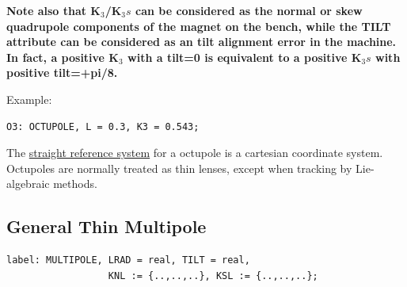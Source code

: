 \textbf{  Note also that K$_3$/K$_3s$ can be considered as the normal or
  skew quadrupole components of the magnet on the bench, while the TILT
  attribute can be considered as an tilt alignment error in the
  machine. In fact, a positive K$_3$ with a tilt=0 is equivalent to a
  positive K$_3s$ with positive tilt=+pi/8. } 

Example: 
\begin{verbatim}
O3: OCTUPOLE, L = 0.3, K3 = 0.543;
\end{verbatim} 

The \href{local_system.html#straight}{straight reference system} for a
octupole is a cartesian coordinate system. Octupoles are normally
treated as thin lenses, except when tracking by Lie-algebraic methods.   



%
\subsection{General Thin Multipole}
\label{sec:multipole}

\begin{verbatim}
label: MULTIPOLE, LRAD = real, TILT = real,
                  KNL := {..,..,..}, KSL := {..,..,..};
\end{verbatim} 

